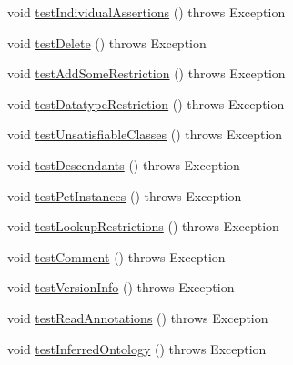 \begin{DoxyCompactItemize}
\item 
void \hyperlink{classuk_1_1ac_1_1manchester_1_1owl_1_1owlapi_1_1tutorialowled2011_1_1_tutorial_snippets_a6a2e596ffc714c8173f661c0b52b8c32}{test\-Individual\-Assertions} ()  throws Exception 
\item 
void \hyperlink{classuk_1_1ac_1_1manchester_1_1owl_1_1owlapi_1_1tutorialowled2011_1_1_tutorial_snippets_af431c72ad3645a0fd88ec96239841e15}{test\-Delete} ()  throws Exception 
\item 
void \hyperlink{classuk_1_1ac_1_1manchester_1_1owl_1_1owlapi_1_1tutorialowled2011_1_1_tutorial_snippets_ab269705c884b3864d909951807930855}{test\-Add\-Some\-Restriction} ()  throws Exception 
\item 
void \hyperlink{classuk_1_1ac_1_1manchester_1_1owl_1_1owlapi_1_1tutorialowled2011_1_1_tutorial_snippets_a4902f0f377da8ebad150de641d2da957}{test\-Datatype\-Restriction} ()  throws Exception 
\item 
void \hyperlink{classuk_1_1ac_1_1manchester_1_1owl_1_1owlapi_1_1tutorialowled2011_1_1_tutorial_snippets_a4ba916ff3d4b797d07a1fcafac6255f6}{test\-Unsatisfiable\-Classes} ()  throws Exception 
\item 
void \hyperlink{classuk_1_1ac_1_1manchester_1_1owl_1_1owlapi_1_1tutorialowled2011_1_1_tutorial_snippets_a25029fe5c81bedce02971bacccf1f50a}{test\-Descendants} ()  throws Exception 
\item 
void \hyperlink{classuk_1_1ac_1_1manchester_1_1owl_1_1owlapi_1_1tutorialowled2011_1_1_tutorial_snippets_a1490c26588ef16e618be726ff50cf4d7}{test\-Pet\-Instances} ()  throws Exception 
\item 
void \hyperlink{classuk_1_1ac_1_1manchester_1_1owl_1_1owlapi_1_1tutorialowled2011_1_1_tutorial_snippets_a9a2c96e113baceb2af629553a026f904}{test\-Lookup\-Restrictions} ()  throws Exception 
\item 
void \hyperlink{classuk_1_1ac_1_1manchester_1_1owl_1_1owlapi_1_1tutorialowled2011_1_1_tutorial_snippets_aa1f80cf6ccb13e345362fa5bdc056bab}{test\-Comment} ()  throws Exception 
\item 
void \hyperlink{classuk_1_1ac_1_1manchester_1_1owl_1_1owlapi_1_1tutorialowled2011_1_1_tutorial_snippets_af1afeabe90f8e3b95660d8e87a6858bb}{test\-Version\-Info} ()  throws Exception 
\item 
void \hyperlink{classuk_1_1ac_1_1manchester_1_1owl_1_1owlapi_1_1tutorialowled2011_1_1_tutorial_snippets_a5be40662275e17cbbe210e51a610c581}{test\-Read\-Annotations} ()  throws Exception 
\item 
void \hyperlink{classuk_1_1ac_1_1manchester_1_1owl_1_1owlapi_1_1tutorialowled2011_1_1_tutorial_snippets_adea8dfef4f796179fad2a0499d5e6ccd}{test\-Inferred\-Ontology} ()  throws Exception 

\end{DoxyCompactItemize}
